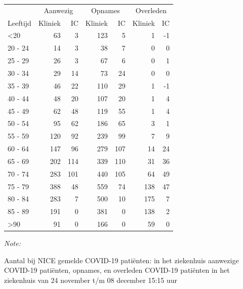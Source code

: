 \documentclass[
  english,
  man,floatsintext]{apa6}
\begin{document}
\begin{table}
\centering\begingroup\fontsize{10}{12}\selectfont

\begin{threeparttable}
\begin{tabular}{lrrrrrr}
\toprule
\multicolumn{1}{c}{ } & \multicolumn{2}{c}{Aanwezig} & \multicolumn{2}{c}{Opnames} & \multicolumn{2}{c}{Overleden} \\
\cmidrule(l{3pt}r{3pt}){2-3} \cmidrule(l{3pt}r{3pt}){4-5} \cmidrule(l{3pt}r{3pt}){6-7}
Leeftijd & Kliniek & IC & Kliniek & IC & Kliniek & IC\\
\midrule
<20 & 63 & 3 & 123 & 5 & 1 & -1\\
20 - 24 & 14 & 3 & 38 & 7 & 0 & 0\\
25 - 29 & 26 & 3 & 67 & 6 & 0 & 1\\
30 - 34 & 29 & 14 & 73 & 24 & 0 & 0\\
35 - 39 & 46 & 22 & 110 & 29 & 1 & -1\\
40 - 44 & 48 & 20 & 107 & 20 & 1 & 4\\
45 - 49 & 62 & 48 & 119 & 55 & 1 & 4\\
50 - 54 & 95 & 62 & 186 & 65 & 3 & 1\\
55 - 59 & 120 & 92 & 239 & 99 & 7 & 9\\
60 - 64 & 147 & 96 & 279 & 107 & 14 & 24\\
65 - 69 & 202 & 114 & 339 & 110 & 31 & 36\\
70 - 74 & 283 & 101 & 440 & 105 & 64 & 49\\
75 - 79 & 388 & 48 & 559 & 74 & 138 & 47\\
80 - 84 & 283 & 7 & 500 & 10 & 175 & 7\\
85 - 89 & 191 & 0 & 381 & 0 & 138 & 2\\
>90 & 91 & 0 & 166 & 0 & 59 & 0\\
\bottomrule
\end{tabular}
\begin{tablenotes}
\item \textit{Note: } 
\item Aantal bij NICE gemelde COVID-19 patiënten: in het ziekenhuis aanwezige COVID-19 patiënten, opnames, en overleden COVID-19 patiënten in het ziekenhuis van 24 november t/m 08 december 15:15 uur
\end{tablenotes}
\end{threeparttable}
\endgroup{}
\end{table}

\newpage
\end{document}
